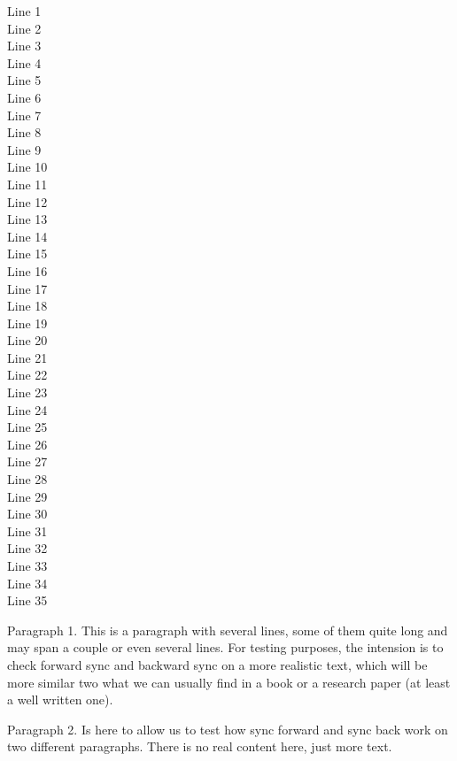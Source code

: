 \documentclass[10pt,english,a4paper,oneside]{amsart}
\begin{document}
Line 1 \\
Line 2 \\
Line 3 \\
Line 4 \\
Line 5 \\
Line 6 \\
Line 7 \\
Line 8 \\
Line 9 \\
Line 10 \\
Line 11 \\
Line 12 \\
Line 13 \\
Line 14 \\
Line 15 \\
Line 16 \\
Line 17 \\
Line 18 \\
Line 19 \\
Line 20 \\
Line 21 \\
Line 22 \\
Line 23 \\
Line 24 \\
Line 25 \\
Line 26 \\
Line 27 \\
Line 28 \\
Line 29 \\
Line 30 \\
Line 31 \\
Line 32 \\
Line 33 \\
Line 34 \\
Line 35 \\

\newpage

Paragraph 1. 
This is a paragraph with several lines, some of them quite long and may span a couple or even several lines.
For testing purposes, the intension is to check forward sync and backward sync on a more realistic text, which will be more similar two what we can usually find in a book or a research paper (at least a well written one).

Paragraph 2.
Is here to allow us to test how sync forward and sync back work on two different paragraphs.
There is no real content here, just more text.
\end{document}
